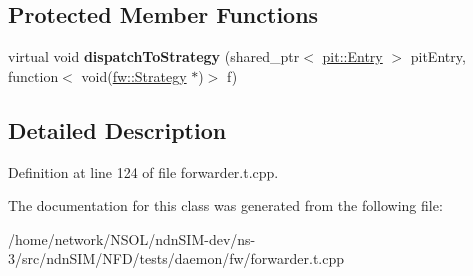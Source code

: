 \subsection*{Protected Member Functions}
\begin{DoxyCompactItemize}
\item 
virtual void {\bfseries dispatch\+To\+Strategy} (shared\+\_\+ptr$<$ \hyperlink{classnfd_1_1pit_1_1Entry}{pit\+::\+Entry} $>$ pit\+Entry, function$<$ void(\hyperlink{classnfd_1_1fw_1_1Strategy}{fw\+::\+Strategy} $\ast$)$>$ f)\hypertarget{classnfd_1_1tests_1_1ScopeLocalhostIncomingTestForwarder_ad65f52f090801dd9fad970d09cb8f2df}{}\label{classnfd_1_1tests_1_1ScopeLocalhostIncomingTestForwarder_ad65f52f090801dd9fad970d09cb8f2df}

\end{DoxyCompactItemize}


\subsection{Detailed Description}


Definition at line 124 of file forwarder.\+t.\+cpp.



The documentation for this class was generated from the following file\+:\begin{DoxyCompactItemize}
\item 
/home/network/\+N\+S\+O\+L/ndn\+S\+I\+M-\/dev/ns-\/3/src/ndn\+S\+I\+M/\+N\+F\+D/tests/daemon/fw/forwarder.\+t.\+cpp\end{DoxyCompactItemize}
